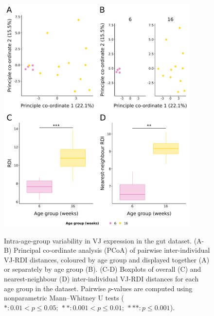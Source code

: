 \begin{figure}
\centering
\includegraphics[width = 0.9\textwidth]{_Figures/png/igseq-gut-rdi-VJ-individual-age}
\begin{subfigure}{0em}
\label{fig:igseq-gut-rdi-VJ-individual-age-pcoa-all}
\end{subfigure}
\begin{subfigure}{0em}
\label{fig:igseq-gut-rdi-VJ-individual-age-pcoa-facet}
\end{subfigure}
\begin{subfigure}{0em}
\label{fig:igseq-gut-rdi-VJ-individual-age-groupdist-all}
\end{subfigure}
\begin{subfigure}{0em}
\label{fig:igseq-gut-rdi-VJ-individual-age-groupdist-nn}
\end{subfigure}
\caption{Intra-age-group variability in VJ expression in the \igseq gut dataset. (A-B) Principal co-ordinate analysis (PCoA) of pairwise inter-individual VJ-RDI distances, coloured by age group and displayed together (A) or separately by age group (B). (C-D) Boxplots of overall (C) and nearest-neighbour (D) inter-individual VJ-RDI distances for each age group in the dataset. Pairwise $p$-values are computed using nonparametric Mann–Whitney U tests ($*: 0.01 < p \leq 0.05;~**: 0.001 < p \leq 0.01;~***: p \leq 0.001$).}
\label{fig:igseq-gut-rdi-VJ-individual-age}
\end{figure}

